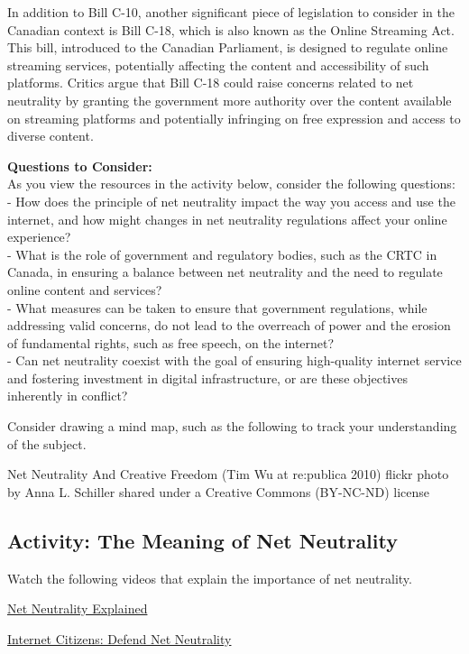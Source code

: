 \documentclass[
]{book}
\theoremstyle{definition}
\theoremstyle{definition}
\theoremstyle{definition}
\theoremstyle{definition}
\theoremstyle{remark}
\begin{document}
In addition to Bill C-10, another significant piece of legislation to consider in the Canadian context is Bill C-18, which is also known as the Online Streaming Act. This bill, introduced to the Canadian Parliament, is designed to regulate online streaming services, potentially affecting the content and accessibility of such platforms. Critics argue that Bill C-18 could raise concerns related to net neutrality by granting the government more authority over the content available on streaming platforms and potentially infringing on free expression and access to diverse content.

\textbf{Questions to Consider:}\\
As you view the resources in the activity below, consider the following questions:\\
- How does the principle of net neutrality impact the way you access and use the internet, and how might changes in net neutrality regulations affect your online experience?\\
- What is the role of government and regulatory bodies, such as the CRTC in Canada, in ensuring a balance between net neutrality and the need to regulate online content and services?\\
- What measures can be taken to ensure that government regulations, while addressing valid concerns, do not lead to the overreach of power and the erosion of fundamental rights, such as free speech, on the internet?\\
- Can net neutrality coexist with the goal of ensuring high-quality internet service and fostering investment in digital infrastructure, or are these objectives inherently in conflict?

Consider drawing a mind map, such as the following to track your understanding of the subject.

Net Neutrality And Creative Freedom (Tim Wu at re:publica 2010) flickr photo by Anna L. Schiller shared under a Creative Commons (BY-NC-ND) license

\hypertarget{activity-the-meaning-of-net-neutrality}{%
\subsection*{Activity: The Meaning of Net Neutrality}\label{activity-the-meaning-of-net-neutrality}}

\begin{reflect}
Watch the following videos that explain the importance of net neutrality.

\href{https://www.youtube.com/watch?v=p90McT24Z6w}{Net Neutrality Explained}

\href{https://www.youtube.com/watch?v=wtt2aSV8wdw}{Internet Citizens: Defend Net Neutrality}
\end{reflect}
\end{document}
